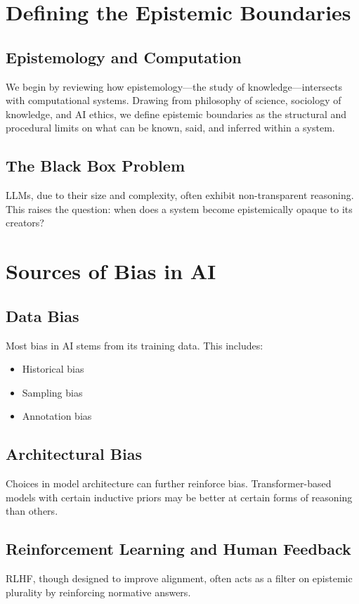 \documentclass{article}
\begin{document}
\section{Defining the Epistemic Boundaries}
\subsection{Epistemology and Computation}
We begin by reviewing how epistemology---the study of knowledge---intersects with computational systems. Drawing from philosophy of science, sociology of knowledge, and AI ethics, we define epistemic boundaries as the structural and procedural limits on what can be known, said, and inferred within a system.

\subsection{The Black Box Problem}
LLMs, due to their size and complexity, often exhibit non-transparent reasoning. This raises the question: when does a system become epistemically opaque to its creators?

\section{Sources of Bias in AI}
\subsection{Data Bias}
Most bias in AI stems from its training data. This includes:
\begin{itemize}
    \item Historical bias
    \item Sampling bias
    \item Annotation bias
\end{itemize}

\subsection{Architectural Bias}
Choices in model architecture can further reinforce bias. Transformer-based models with certain inductive priors may be better at certain forms of reasoning than others.

\subsection{Reinforcement Learning and Human Feedback}
RLHF, though designed to improve alignment, often acts as a filter on epistemic plurality by reinforcing normative answers.
\end{document}
